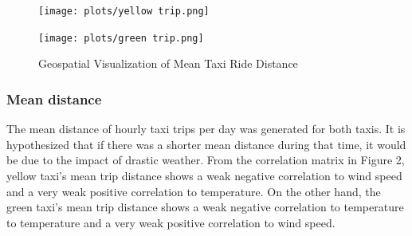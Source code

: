 \documentclass[11pt]{article}
\begin{document}
\begin{figure}[ht]
     \centering
     \begin{minipage}[b]{0.49\textwidth}
         \centering
         \texttt{[image: plots/yellow trip.png]}
     \end{minipage}
     \hfill
     \begin{minipage}[b]{0.495\textwidth}
         \centering
         \texttt{[image: plots/green trip.png]}
     \end{minipage}
     \hfill
     \caption{Geospatial Visualization of Mean Taxi Ride Distance}
\end{figure}

\subsubsection{Mean distance}
The mean distance of hourly taxi trips per day was generated for both taxis. It is hypothesized that if there was a shorter mean distance during that time, it would be due to the impact of drastic weather. From the correlation matrix in Figure 2, yellow taxi's mean trip distance shows a weak negative correlation to wind speed and a very weak positive correlation to temperature. On the other hand, the green taxi's mean trip distance shows a weak negative correlation to temperature to temperature and a very weak positive correlation to wind speed.
\end{document}
